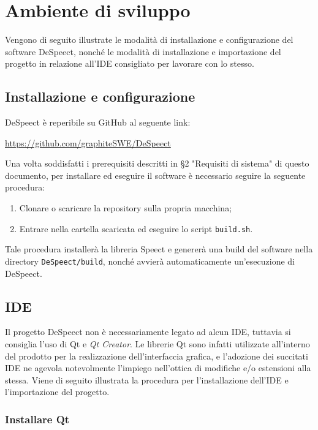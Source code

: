 \documentclass[openany,12pt,a4paper]{report}
\begin{document}
	\chapter{Ambiente di sviluppo}
	
	Vengono di seguito illustrate le modalità di installazione e configurazione del software DeSpeect, nonché le modalità di installazione e importazione del progetto in relazione all'IDE consigliato per lavorare con lo stesso.
	
	\section{Installazione e configurazione}
	
	DeSpeect è reperibile su GitHub al seguente link:
	\begin{center}
		\url{https://github.com/graphiteSWE/DeSpeect}
	\end{center}
	
	\noindent Una volta soddisfatti i prerequisiti descritti in §2 "Requisiti di sistema" di questo documento, per installare ed eseguire il software è necessario seguire la seguente procedura:
	\begin{enumerate}
		\item Clonare o scaricare la repository sulla propria macchina;
		\item Entrare nella cartella scaricata ed eseguire lo script \verb|build.sh|.
	\end{enumerate}
	Tale procedura installerà la libreria Speect e genererà una build del software nella directory \verb|DeSpeect/build|, nonché avvierà automaticamente un'esecuzione di DeSpeect.
	
	\section{IDE}
	Il progetto DeSpeect non è necessariamente legato ad alcun IDE, tuttavia si consiglia l'uso di Qt e \textit{Qt Creator}. Le librerie Qt sono infatti utilizzate all'interno del prodotto per la realizzazione dell'interfaccia grafica, e l'adozione dei succitati IDE ne agevola notevolmente l'impiego nell'ottica di modifiche e/o estensioni alla stessa. Viene di seguito illustrata la procedura per l'installazione dell'IDE e l'importazione del progetto.
	
	\subsection{Installare Qt}
	
\end{document}
